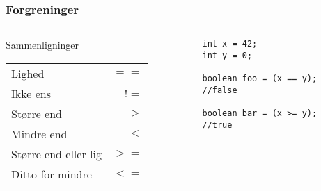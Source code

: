 \documentclass{beamer}
\begin{document}
\begin{frame}[fragile]
  \frametitle{Forgreninger}
  \begin{columns}
    \begin{column}{0.5\textwidth}
      \begin{block}{Sammenligninger}
          \begin{table}[h]
            \centering
            \begin{tabular}{lr}
              \hline
        Lighed & $==$ \\
        Ikke ens & $!=$\\
        Større end & $> $\\
        Mindre end & $<$\\
        Større end eller lig & $>=$\\
        Ditto for mindre & $<=$\\
              
            \end{tabular}
          \end{table}
      \end{block}
    \end{column}
    \begin{column}{0.5\textwidth}
\begin{verbatim} 
int x = 42;
int y = 0;

boolean foo = (x == y);
//false

boolean bar = (x >= y);
//true

\end{verbatim}
    \end{column}
  \end{columns}
\end{frame}
\end{document}
